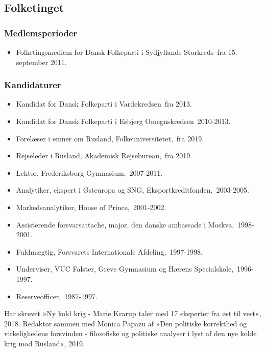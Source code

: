 \documentclass[11pt, a4paper]{awesome-cv}
\begin{document}
\begin{cvletter}
\subsection*{Folketinget}
\subsubsection*{Medlemsperioder}
\begin{itemize}
\item Folketingsmedlem for Dansk Folkeparti i Sydjyllands Storkreds fra 15. september 2011.
\end{itemize}
\subsubsection*{Kandidaturer}
\begin{itemize}
\item Kandidat for Dansk Folkeparti i Vardekredsen fra 2013.
\item Kandidat for Dansk Folkeparti i Esbjerg Omegnskredsen 2010-2013.
\end{itemize}
\begin{itemize}
\item Forelæser i emner om Rusland, Folkeuniversitetet, fra 2019.
\item Rejseleder i Rusland, Akademisk Rejsebureau, fra 2019.
\item Lektor, Frederiksborg Gymnasium, 2007-2011.
\item Analytiker, ekspert i Østeuropa og SNG, Eksportkreditfonden, 2003-2005.
\item Markedsanalytiker, House of Prince, 2001-2002.
\item Assisterende forsvarsattache, major, den danske ambassade i Moskva, 1998-2001.
\item Fuldmægtig, Forsvarets Internationale Afdeling, 1997-1998.
\item Underviser, VUC Falster, Greve Gymnasium og Hærens Specialskole, 1996-1997.
\item Reserveofficer, 1987-1997.
\end{itemize}
Har skrevet »Ny kold krig - Marie Krarup taler med 17 eksperter fra øst til vest«, 2018. Redaktør sammen med Monica Papazu af »Den politiske korrekthed og virkelighedens forsvinden - filosofiske og politiske analyser i lyst af den nye kolde krig mod Rusland«, 2019.

\end{cvletter}
\end{document}
